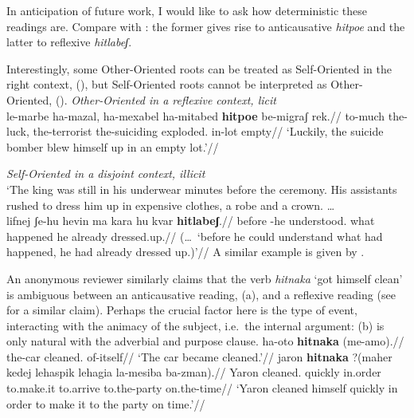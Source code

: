 In anticipation of future work, I would like to ask how deterministic these readings are. Compare   with  : the former gives rise to anticausative \emph{hitpo{\texttslig}e\texttslig} and the latter to reflexive \emph{hitlabeʃ}.
\ex{}
\xe

Interestingly, some Other-Oriented roots can be treated as Self-Oriented in the right context, (\nextx), but Self-Oriented roots cannot be interpreted as Other-Oriented, (\anextx).
\ex \textit{Other-Oriented  in a reflexive context, licit}\\
\begingl
\gla le-marbe ha-mazal, ha-mexabel ha-mitabed \textbf{hitpo{\texttslig}e\texttslig} be-migraʃ rek.//
\glb to-much the-luck, the-terrorist the-suiciding exploded. in-lot empty//
\glft `Luckily, the suicide bomber blew himself up in an empty lot.'//
\endgl
\xe

\ex \textit{Self-Oriented  in a disjoint context, illicit}\\
`The king was still in his underwear minutes before the ceremony. His assistants rushed to dress him up in expensive clothes, a robe and a crown. \dots\\
\begingl
\gla\ljudge{*}lifnej ʃe-hu hevin ma kara hu kvar \textbf{hitlabeʃ}.//
\glb before -he understood. what happened he already dressed.up.//
\glft (\dots~`before he could understand what had happened, he had already dressed up.)'//
\endgl
\xe
A similar example is given by \cite{beaverskoontzgarboden13a}.

An anonymous reviewer similarly claims that the verb \emph{hitnaka} `got himself clean' is ambiguous between an anticausative reading, (\nextx a), and a reflexive reading (see \citealt[11]{doron03} for a similar claim). Perhaps the crucial factor here is the type of event, interacting with the animacy of the subject, i.e.~the internal argument: (\nextx b) is only natural with the adverbial and purpose clause.
\pex
	\a \begingl
		\gla ha-oto \textbf{hitnaka} (me-a{\texttslig}mo).//
		\glb the-car cleaned. \phantom{(}of-itself//
		\glft `The car became cleaned.'//
	\endgl
	\a \begingl
		\gla jaron \textbf{hitnaka} \textup{?}(maher kedej lehaspik lehagia la-mesiba ba-zman).//
		\glb Yaron cleaned. \phantom{?(}quickly in.order to.make.it to.arrive to.the-party on.the-time//
		\glft `Yaron cleaned himself quickly in order to make it to the party on time.'//
	\endgl
\xe

